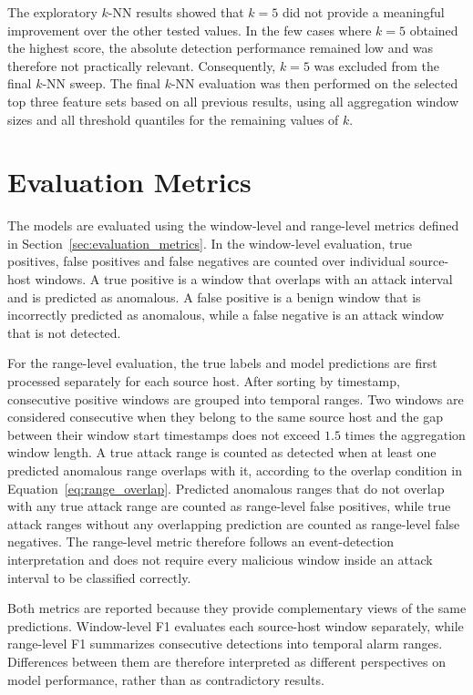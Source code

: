 The exploratory $k$-NN results showed that $k=5$ did not provide a meaningful improvement over the other tested values. In the few cases where $k=5$ obtained the highest score, the absolute detection performance remained low and was therefore not practically relevant. Consequently, $k=5$ was excluded from the final $k$-NN sweep. The final $k$-NN evaluation was then performed on the selected top three feature sets based on all previous results, using all aggregation window sizes and all threshold quantiles for the remaining values of $k$.







\section{Evaluation Metrics}

The models are evaluated using the window-level and range-level metrics defined in Section~\ref{sec:evaluation_metrics}. In the window-level evaluation, true positives, false positives and false negatives are counted over individual source-host windows. A true positive is a window that overlaps with an attack interval and is predicted as anomalous. A false positive is a benign window that is incorrectly predicted as anomalous, while a false negative is an attack window that is not detected.

For the range-level evaluation, the true labels and model predictions are first processed separately for each source host. After sorting by timestamp, consecutive positive windows are grouped into temporal ranges. Two windows are considered consecutive when they belong to the same source host and the gap between their window start timestamps does not exceed \(1.5\) times the aggregation window length. A true attack range is counted as detected when at least one predicted anomalous range overlaps with it, according to the overlap condition in Equation~\ref{eq:range_overlap}. Predicted anomalous ranges that do not overlap with any true attack range are counted as range-level false positives, while true attack ranges without any overlapping prediction are counted as range-level false negatives. The range-level metric therefore follows an event-detection interpretation and does not require every malicious window inside an attack interval to be classified correctly.


Both metrics are reported because they provide complementary views of the same predictions. Window-level F1 evaluates each source-host window separately, while range-level F1 summarizes consecutive detections into temporal alarm ranges. Differences between them are therefore interpreted as different perspectives on model performance, rather than as contradictory results.





